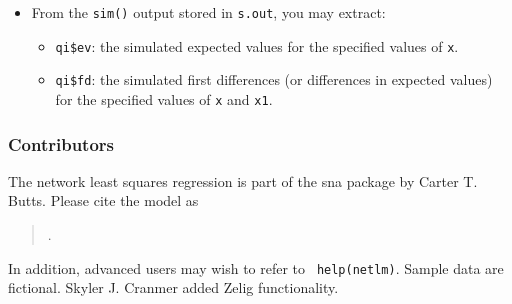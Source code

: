 \begin{itemize}
\item From the {\tt sim()} output stored in {\tt s.out}, you may extract:
\begin{itemize}
\item {\tt qi\$ev}: the simulated expected values for the specified values of {\tt x}.
\item {\tt qi\$fd}: the simulated first differences (or differences in
expected values) for the specified values of {\tt x} and {\tt x1}.
\end{itemize}
\end{itemize}

\subsubsection{Contributors}
The network least squares regression is part of the sna package by
Carter T. Butts.  Please cite the model as
\begin{verse}
.
\end{verse}
In addition, advanced users may wish to refer to {\tt
help(netlm)}. Sample data are fictional. Skyler J. Cranmer added Zelig
functionality.
